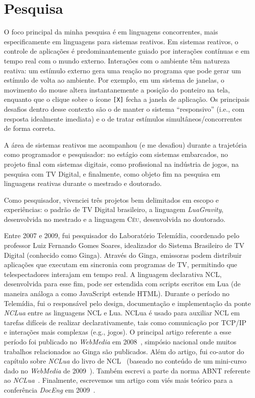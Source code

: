 \documentclass[12pt,a4paper]{article}
\newcommand{\code}[1] {{\small{\texttt{#1}}}}
\newcommand{\CEU}{\textsc{C\'{e}u}\xspace}
\newcommand{\GVT}{\emph{LuaGravity}\xspace}
\begin{document}
\section*{Pesquisa}

O foco principal da minha pesquisa é em linguagens concorrentes, mais 
especificamente em linguagens para sistemas reativos.
%
Em sistemas reativos, o controle de aplicações é predominantemente guiado por 
interações contínuas e em tempo real com o mundo externo.
%
Interações com o ambiente têm natureza reativa: um estímulo externo gera uma 
reação no programa que pode gerar um estímulo de volta ao ambiente.
%
Por exemplo, em um sistema de janelas, o movimento do mouse altera 
instantanemente a posição do ponteiro na tela, enquanto que o clique sobre o 
ícone \code{[X]} fecha a janela de aplicação.
%
Os principais desafios dentro desse contexto são o de manter o sistema 
``responsivo'' (i.e., com resposta idealmente imediata) e o de tratar estímulos 
simultâneos/concorrentes de forma correta.

A área de sistemas reativos me acompanhou (e me desafiou) durante a trajetória 
como programador e pesquisador:
no estágio com sistemas embarcados, no projeto final com sistemas digitais, 
como profissional na indústria de jogos, na pesquisa com TV Digital, e 
finalmente, como objeto fim na pesquisa em linguagens reativas durante o 
mestrado e doutorado.

Como pesquisador, vivenciei três projetos bem delimitados em escopo e 
experiências: o padrão de TV Digital brasileiro, a linguagem \GVT, desenvolvida 
no mestrado e a linguagem \CEU, desenvolvida no doutorado.

Entre 2007 e 2009, fui pesquisador do Laboratório Telemídia, coordenado pelo 
professor Luiz Fernando Gomes Soares, idealizador do Sistema Brasileiro de TV 
Digital (conhecido como Ginga).
%
Através do Ginga, emissoras podem distribuir aplicações que executam em 
sincronia com programas de TV, permitindo que telespectadores interajam em 
tempo real.
%
A linguagem declarativa NCL, desenvolvida para esse fim, pode ser estendida com 
scripts escritos em Lua (de maneira análoga a como JavaScript estende HTML).
%
Durante o período no Telemídia, fui o responsável pelo design, documentação e 
implementação da ponte \emph{NCLua} entre as linguagens NCL e Lua.
%
NCLua é usado para auxiliar NCL em tarefas difíceis de realizar 
declarativamente, tais como comunicação por TCP/IP e interações mais complexas 
(e.g., jogos).
%
O principal artigo referente a esse período foi publicado no \emph{WebMedia} em 
2008~\cite{nclua.webmedia}, simpósio nacional onde muitos trabalhos 
relacionados ao Ginga são publicados.
Além do artigo, fui co-autor do capítulo sobre \emph{NCLua} do livro de 
NCL~\cite{nclua.book} (baseado no conteúdo de um mini-curso dado no 
\emph{WebMedia} de 2009~\cite{nclua.shortcourse}).
Também escrevi a parte da norma ABNT referente ao 
\emph{NCLua}~\cite{nclua.abnt}.
Finalmente, escrevemos um artigo com viés mais teórico para a conferência 
\emph{DocEng} em 2009~\cite{nclua.doceng}.
\end{document}
